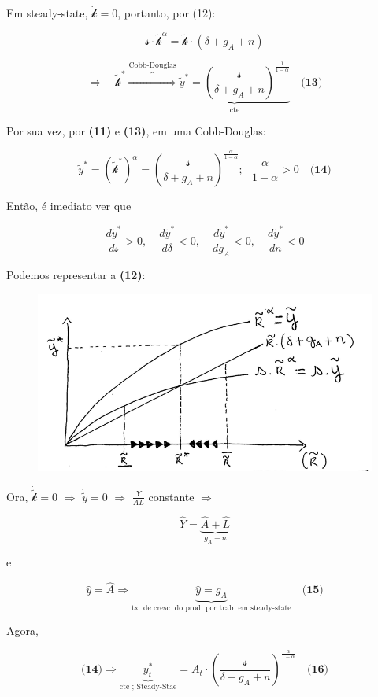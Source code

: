 \documentclass[a4paper,12pt]{article}[abntex2]
\begin{document}
Em steady-state, \( \dot{\mathcal{k}} = 0 \), portanto, por (12):

\[
\mathcal{s} \cdot \tilde{\mathcal{k}}^{\alpha} = \tilde{\mathcal{k}} \cdot (\delta + g_A + n)
\]

\[
\Rightarrow \quad \tilde{\mathcal{k}}^* \overbrace{\Rightarrow}^\text{Cobb-Douglas} \underbrace{\tilde{y}^* = \left( \frac{\mathcal{s}}{\delta + g_A + n} \right)^{\frac{1}{1-\alpha}}}_\text{cte} \quad \textbf{(13)}
\]

Por sua vez, por \textbf{(11)} e \textbf{(13)}, em uma Cobb-Douglas:

\[
\tilde{y}^* = (\tilde{\mathcal{k}}^*)^{\alpha} = \left( \frac{\mathcal{s}}{\delta + g_A + n} \right)^{\frac{\alpha}{1-\alpha}} ;\ \ \ \frac{\alpha}{1-\alpha}> 0 \quad \textbf{(14)}
\]

Então, é imediato ver que

\[
\frac{d\tilde{y}^*}{d\mathcal{s}} > 0, \quad \frac{d\tilde{y}^*}{d\delta} < 0, \quad \frac{d\tilde{y}^*}{dg_A} < 0, \quad \frac{d\tilde{y}^*}{dn} < 0
\]

Podemos representar a \textbf{(12)}:

\begin{figure}[H]
    \centering
    \includegraphics[width=0.7\linewidth]{Imagens/a10i1.png}
\end{figure}

Ora, \(\dot{\tilde{\mathcal{k}}} = 0\) \(\Rightarrow\) \(\dot{\tilde{y}} = 0\) \(\Rightarrow\) \(\frac{Y}{AL}\) constante \(\Rightarrow\)

\[
\hat{Y} = \underbrace{\hat{A} + \hat{L}}_{g_A + n}
\]

e 

\[
\hat{y} = \hat{A} \Rightarrow \underbrace{\hat{y} = {g_A}}_{\text{tx. de cresc. do prod. por trab. em steady-state}} \quad \textbf{(15)}
\]

Agora,

\[
\textbf{(14)} \Rightarrow \underbrace{y_t^*}_\text{cte ; Steady-Stae} = A_t \cdot \left( \frac{\mathcal{s}}{\delta + g_A + n} \right)^{\frac{\alpha}{1-\alpha}} \quad \textbf{(16)}
\]
\end{document}
